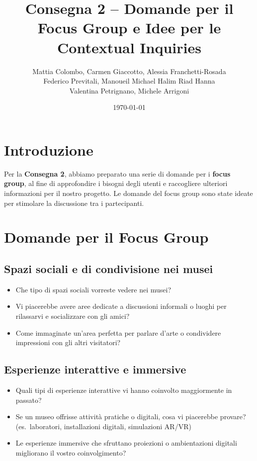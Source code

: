\documentclass{article}
\title{Consegna 2 – Domande per il Focus Group e Idee per le Contextual Inquiries}
\author{Mattia Colombo, Carmen Giaccotto, Alessia Franchetti-Rosada \\Federico Previtali, Manoueil Michael Halim Riad Hanna \\ Valentina Petrignano, Michele Arrigoni}
\date{\today}
\begin{document}
\maketitle

\section*{Introduzione}

Per la \textbf{Consegna 2}, abbiamo preparato una serie di domande per i \textbf{focus group}, al fine di approfondire i bisogni degli utenti e raccogliere ulteriori informazioni per il nostro progetto. Le domande del focus group sono state ideate per stimolare la discussione tra i partecipanti.

\section{Domande per il Focus Group}

\subsection{Spazi sociali e di condivisione nei musei}

\begin{itemize}
    \item Che tipo di spazi sociali vorreste vedere nei musei?
    \item Vi piacerebbe avere aree dedicate a discussioni informali o luoghi per rilassarvi e socializzare con gli amici?
    \item Come immaginate un’area perfetta per parlare d’arte o condividere impressioni con gli altri visitatori?
\end{itemize}

\subsection{Esperienze interattive e immersive}

\begin{itemize}
    \item Quali tipi di esperienze interattive vi hanno coinvolto maggiormente in passato?
    \item Se un museo offrisse attività pratiche o digitali, cosa vi piacerebbe provare? (es.\ laboratori, installazioni digitali, simulazioni AR/VR)
    \item Le esperienze immersive che sfruttano proiezioni o ambientazioni digitali migliorano il vostro coinvolgimento?
\end{itemize}
\end{document}
